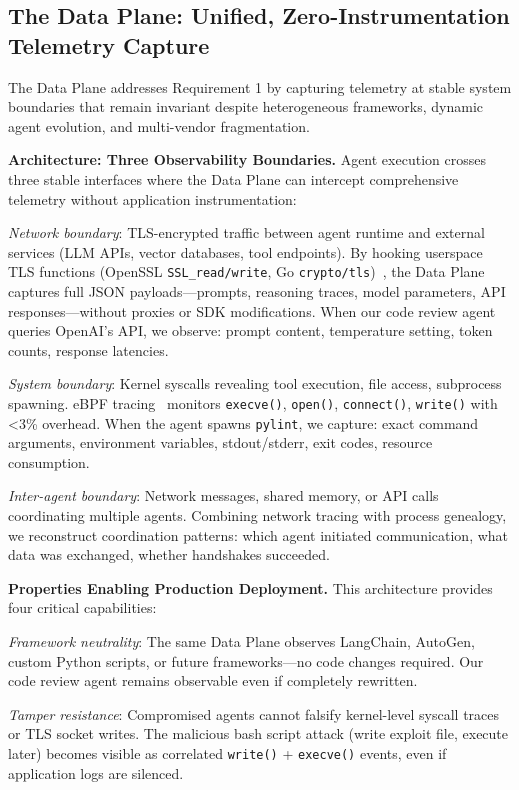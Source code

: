 \documentclass[sigplan,screen,9pt]{acmart}
\begin{document}
\subsection{The Data Plane: Unified, Zero-Instrumentation Telemetry Capture}

The Data Plane addresses Requirement 1 by capturing telemetry at stable system boundaries that remain invariant despite heterogeneous frameworks, dynamic agent evolution, and multi-vendor fragmentation.

\textbf{Architecture: Three Observability Boundaries.} Agent execution crosses three stable interfaces where the Data Plane can intercept comprehensive telemetry without application instrumentation:

\emph{Network boundary}: TLS-encrypted traffic between agent runtime and external services (LLM APIs, vector databases, tool endpoints). By hooking userspace TLS functions (OpenSSL \texttt{SSL\_read/write}, Go \texttt{crypto/tls})~\cite{zheng2025extending}, the Data Plane captures full JSON payloads—prompts, reasoning traces, model parameters, API responses—without proxies or SDK modifications. When our code review agent queries OpenAI's API, we observe: prompt content, temperature setting, token counts, response latencies.

\emph{System boundary}: Kernel syscalls revealing tool execution, file access, subprocess spawning. eBPF tracing~\cite{brendangregg,ebpfio} monitors \texttt{execve()}, \texttt{open()}, \texttt{connect()}, \texttt{write()} with <3\% overhead. When the agent spawns \texttt{pylint}, we capture: exact command arguments, environment variables, stdout/stderr, exit codes, resource consumption.

\emph{Inter-agent boundary}: Network messages, shared memory, or API calls coordinating multiple agents. Combining network tracing with process genealogy, we reconstruct coordination patterns: which agent initiated communication, what data was exchanged, whether handshakes succeeded.

\textbf{Properties Enabling Production Deployment.} This architecture provides four critical capabilities:

\emph{Framework neutrality}: The same Data Plane observes LangChain, AutoGen, custom Python scripts, or future frameworks—no code changes required. Our code review agent remains observable even if completely rewritten.

\emph{Tamper resistance}: Compromised agents cannot falsify kernel-level syscall traces or TLS socket writes. The malicious bash script attack (write exploit file, execute later) becomes visible as correlated \texttt{write()} + \texttt{execve()} events, even if application logs are silenced.
\end{document}

